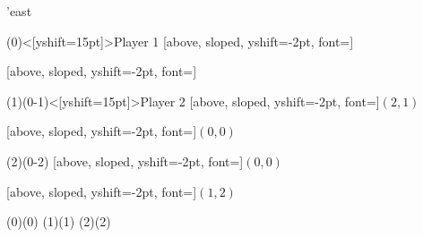 

\begin{istgame}[font=\small]
    \setistgrowdirection'{east}



    \xtdistance{30mm}{25mm}

    \istroot(0)<[yshift=15pt]>{Player 1}
        [above, sloped, yshift=-2pt, font=\scriptsize]
        
        [above, sloped, yshift=-2pt, font=\scriptsize]
    \endist



    \xtdistance{30mm}{12mm}
    
    \istroot(1)(0-1)<[yshift=15pt]>{Player 2}
        [above, sloped, yshift=-2pt, font=\scriptsize]{$(2, 1)$}
        
        [above, sloped, yshift=-2pt, font=\scriptsize]{$(0, 0)$}
    \endist

    \istroot(2)(0-2){}
        [above, sloped, yshift=-2pt, font=\scriptsize]{$(0, 0)$}
        
        [above, sloped, yshift=-2pt, font=\scriptsize]{$(1, 2)$}
    \endist
    
    \xtInfosetO[fill=color2!25](0)(0) %
    \xtInfosetO[fill=color4!25](1)(1) %
    \xtInfosetO[fill=color4!25](2)(2) %

\end{istgame}